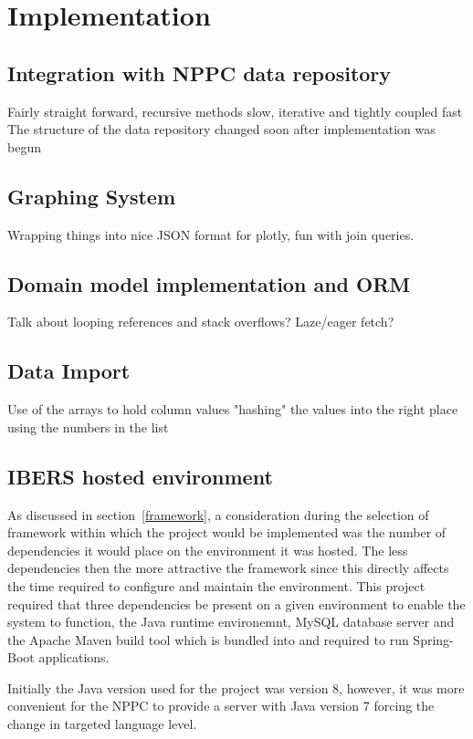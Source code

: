 \chapter{Implementation}



\section{Integration with NPPC data repository}
Fairly straight forward, recursive methods slow, iterative and tightly coupled fast
The structure of the data repository changed soon after implementation was begun
\section{Graphing System}
Wrapping things into nice JSON format for plotly, fun with join queries.

\section{Domain model implementation and ORM}
Talk about looping references and stack overflows? Laze/eager fetch? 

\section{Data Import}
Use of the arrays to hold column values "hashing" the values into the right place using the numbers in the list

\section{IBERS hosted environment}



As discussed in section~\ref{framework}, a consideration during the selection of framework within which the project would be implemented was the number of dependencies it would place on the environment it was hosted. The less dependencies then the more attractive the framework since this directly affects the time required to configure and maintain the environment. This project required that three dependencies be present on a given environment to enable the system to function, the Java runtime environemnt, MySQL database server and the Apache Maven build tool which is bundled into and required to run Spring-Boot applications. 

Initially the Java version used for the project was version 8, however, it was more convenient for the NPPC to provide a server with Java version 7 forcing the change in targeted language level.

